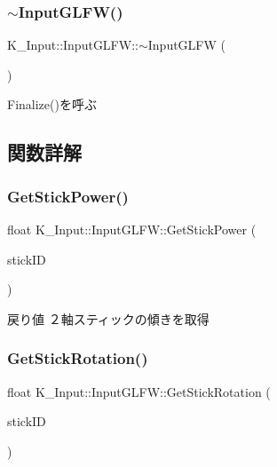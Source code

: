 \subsubsection{\texorpdfstring{$\sim$\+Input\+G\+L\+F\+W()}{~InputGLFW()}}
{\footnotesize\ttfamily K\+\_\+\+Input\+::\+Input\+G\+L\+F\+W\+::$\sim$\+Input\+G\+L\+FW (\begin{DoxyParamCaption}{ }\end{DoxyParamCaption})}



Finalize()を呼ぶ 



\subsection{関数詳解}
\mbox{\label{class_k___input_1_1_input_g_l_f_w_a2c0ac7fae2b7f1c002a2649f28491cb9}} 
\subsubsection{\texorpdfstring{Get\+Stick\+Power()}{GetStickPower()}}
{\footnotesize\ttfamily float K\+\_\+\+Input\+::\+Input\+G\+L\+F\+W\+::\+Get\+Stick\+Power (\begin{DoxyParamCaption}\item[{\mbox{\hyperlink{namespace_k___input_a18bb7eb174cac2fd54b7a5b0d02a0116}{Vpad\+Stick}}}]{stick\+ID }\end{DoxyParamCaption})}

\begin{DoxyReturn}{戻り値}
２軸スティックの傾きを取得 
\end{DoxyReturn}
\mbox{\label{class_k___input_1_1_input_g_l_f_w_ada9df50df10a8636445468d3f04ad98e}} 
\subsubsection{\texorpdfstring{Get\+Stick\+Rotation()}{GetStickRotation()}}
{\footnotesize\ttfamily float K\+\_\+\+Input\+::\+Input\+G\+L\+F\+W\+::\+Get\+Stick\+Rotation (\begin{DoxyParamCaption}\item[{\mbox{\hyperlink{namespace_k___input_a18bb7eb174cac2fd54b7a5b0d02a0116}{Vpad\+Stick}}}]{stick\+ID }\end{DoxyParamCaption})}

